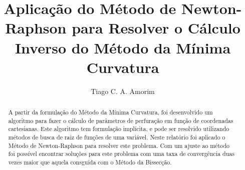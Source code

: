 \documentclass[final,3p,12pt]{elsarticle}
\begin{document}
\begin{frontmatter}



\title{Aplicação do Método de Newton-Raphson para Resolver o Cálculo Inverso do Método da Mínima Curvatura}


\author{Tiago C. A. Amorim}

\begin{abstract}

    A partir da formulação do Método da Mínima Curvatura, foi desenvolvido um algoritmo para fazer o cálculo de parâmetros de perfuração em função de coordenadas cartesianas. Este algoritmo tem formulação implícita, e pode ser resolvido utilizando métodos de busca de raiz de funções de uma variável. Neste relatório foi aplicado o Método de Newton-Raphson para resolver este problema. Com um ajuste ao método foi possível encontrar soluções para este problema com uma taxa de convergência duas vezes maior que aquela consguida com o Método da Bissecção.


\end{abstract}
\end{frontmatter}
\end{document}
